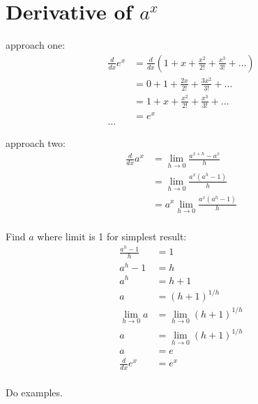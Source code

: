 \documentclass[letterpaper, portrait]{exam}
\begin{document}
  \section{Derivative of $a^x$} %

  approach one:
  \begin{align*}
    \frac{d}{dx} e^x &= \frac{d}{dx} \left( 1 + x + \frac{x^2}{2!} + \frac{x^3}{3!} + \ldots  \right) \\
                     &= 0 + 1 + \frac{2 x}{2!} + \frac{3x^2}{3!} + \ldots \\
                     &= 1 + x + \frac{x^2}{2!} + \frac{x^3}{3!} + \ldots \\
                     &= e^x \\
    \ldots
  \end{align*}

  approach two:
  \begin{align*}
    \frac{d}{dx} a^x & = \lim_{h \to 0} \frac{a^{x + h} - a^x}{h} \\
                     & = \lim_{h \to 0} \frac{a^x \left( a^h - 1 \right)}{h} \\
                     & = a^x \lim_{h \to 0} \frac{a^x \left( a^h - 1 \right)}{h} \\
  \end{align*}

  Find $a$ where limit is 1 for simplest result:
  \begin{align*}
    \frac{a^h - 1}{h} & = 1 \\
    a^h - 1           & = h \\
    a^h               & = h + 1 \\
    a                 & = \left( h + 1 \right)^{1/h} \\
    \lim_{h \to 0} a  & = \lim_{h \to 0} \left( h + 1 \right)^{1/h} \\
    a                 & = \lim_{h \to 0} \left( h + 1 \right)^{1/h} \\
    a                 & = e \\
    \frac{d}{dx} e^x  & = e^x \\
  \end{align*}

  Do examples.
\end{document}
